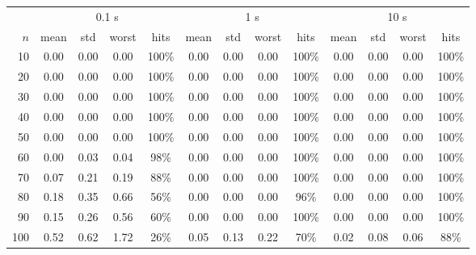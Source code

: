 \begin{tabular}{rcccccccccccc}
\toprule
& \multicolumn{4}{c}{0.1 s} & \multicolumn{4}{c}{1 s} & \multicolumn{4}{c}{10 s} \\
\cmidrule(lr){2-5} \cmidrule(lr){6-9} \cmidrule(lr){10-13}
$n$ & mean & std & worst & hits& mean & std & worst & hits& mean & std & worst & hits \\
\midrule
10 & 0.00 & 0.00 & 0.00 & 100\% & 0.00 & 0.00 & 0.00 & 100\% & 0.00 & 0.00 & 0.00 & 100\% \\
20 & 0.00 & 0.00 & 0.00 & 100\% & 0.00 & 0.00 & 0.00 & 100\% & 0.00 & 0.00 & 0.00 & 100\% \\
30 & 0.00 & 0.00 & 0.00 & 100\% & 0.00 & 0.00 & 0.00 & 100\% & 0.00 & 0.00 & 0.00 & 100\% \\
40 & 0.00 & 0.00 & 0.00 & 100\% & 0.00 & 0.00 & 0.00 & 100\% & 0.00 & 0.00 & 0.00 & 100\% \\
50 & 0.00 & 0.00 & 0.00 & 100\% & 0.00 & 0.00 & 0.00 & 100\% & 0.00 & 0.00 & 0.00 & 100\% \\
60 & 0.00 & 0.03 & 0.04 & 98\% & 0.00 & 0.00 & 0.00 & 100\% & 0.00 & 0.00 & 0.00 & 100\% \\
70 & 0.07 & 0.21 & 0.19 & 88\% & 0.00 & 0.00 & 0.00 & 100\% & 0.00 & 0.00 & 0.00 & 100\% \\
80 & 0.18 & 0.35 & 0.66 & 56\% & 0.00 & 0.00 & 0.00 & 96\% & 0.00 & 0.00 & 0.00 & 100\% \\
90 & 0.15 & 0.26 & 0.56 & 60\% & 0.00 & 0.00 & 0.00 & 100\% & 0.00 & 0.00 & 0.00 & 100\% \\
100 & 0.52 & 0.62 & 1.72 & 26\% & 0.05 & 0.13 & 0.22 & 70\% & 0.02 & 0.08 & 0.06 & 88\% \\
\bottomrule
\end{tabular}
